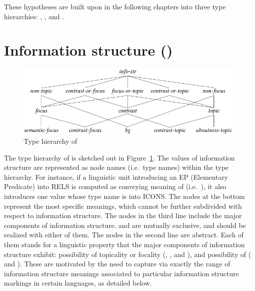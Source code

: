 \noindent These hypotheses are built upon in the following chapters
into three type hierarchies: , , and
.


\section{Information structure \textnormal{(}\textnormal{)}}
\label{9:sec:info-str}



\begin{figure}[!t]
\begin{center} 
\includegraphics[width=\textwidth]{pdf/info-str.pdf}
\caption{Type hierarchy of }
\label{fig:info-str}
\end{center}
\end{figure}

\noindent The type hierarchy of  is sketched out in
Figure~\ref{fig:info-str}. The values of
information structure are represented as node names (i.e.\ type names)
within the  type hierarchy.  For instance, if a
linguistic unit introducing an EP (Elementary Predicate) into RELS is
computed as conveying meaning of 
(i.e.\ ), it also introduces one 
value whose type name is  into ICONS.
The nodes at the bottom represent the most specific meanings, which cannot be
further subdivided with respect to information structure. The nodes in
the third line include the major components of information
structure.  and  are mutually exclusive, and
 should be realized with either of them. The nodes in
the second line are abstract. Each of them stands for a linguistic
property that the major components of information structure exhibit:
possibility of topicality or focality (,
, and ), and possibility of
 ( and ).
These are motivated by the need to capture via
 exactly the range of information structure
meanings associated to particular information structure markings in
certain languages, as detailed below.




